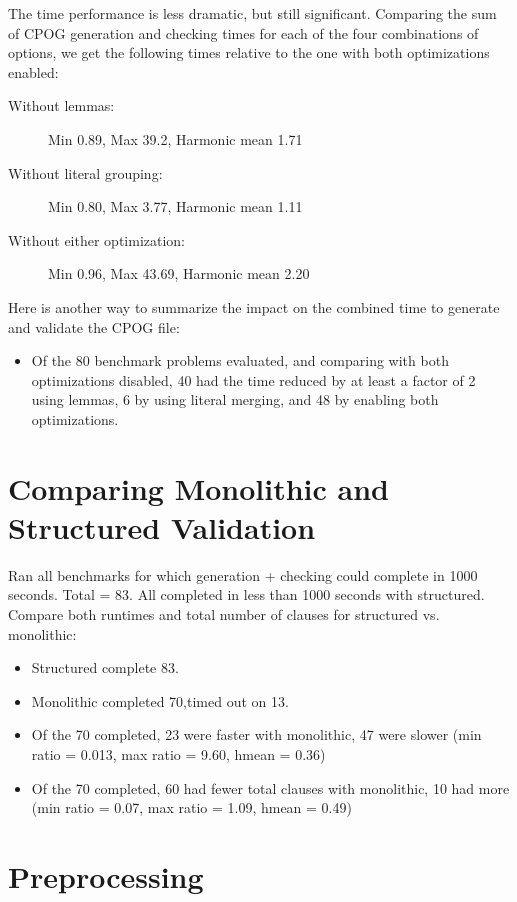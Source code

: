 \documentclass[letterpaper,USenglish,cleveref, autoref, thm-restate]{lipics-v2021}
\begin{document}
The time performance is less dramatic, but still significant.
Comparing the sum of CPOG generation and checking times for each of
the four combinations of options, we get the following times relative
to the one with both optimizations enabled:
\begin{description}
\item[Without lemmas:] Min 0.89, Max 39.2, Harmonic mean 1.71
\item[Without literal grouping:] Min 0.80, Max 3.77, Harmonic mean 1.11
\item[Without either optimization:] Min 0.96, Max 43.69, Harmonic mean 2.20
\end{description}

Here is another way to summarize the impact on the combined time to generate and validate the CPOG file:
\begin{itemize}
\item Of the 80 benchmark problems evaluated, and comparing with both
  optimizations disabled, 40 had the time reduced by at least a factor of 2
  using lemmas, 6 by using literal merging, and 48 by enabling both
  optimizations.
\end{itemize}

\section{Comparing Monolithic and Structured Validation}





Ran all benchmarks for which generation + checking could complete in 1000 seconds.  Total = 83.  All completed in less than 1000 seconds with structured.
Compare both runtimes and total number of clauses for structured vs. monolithic:
\begin{itemize}
\item Structured complete 83.
\item Monolithic completed  70,timed out on 13.
\item Of the 70 completed, 23 were faster with monolithic, 47 were slower (min ratio = 0.013, max ratio = 9.60, hmean = 0.36)
\item Of the 70 completed, 60 had fewer total clauses with monolithic, 10 had more (min ratio = 0.07, max ratio = 1.09, hmean = 0.49)
\end{itemize}

\section{Preprocessing}
\end{document}
